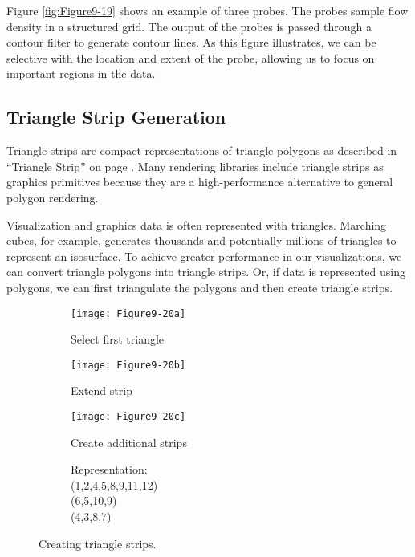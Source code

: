 Figure \ref{fig:Figure9-19} shows an example of three probes. The probes sample flow density in a structured grid. The output of the probes is passed through a contour filter to generate contour lines. As this figure illustrates, we can be selective with the location and extent of the probe, allowing us to focus on important regions in the data.

\subsection{Triangle Strip Generation}

Triangle strips are compact representations of triangle polygons as described in ``Triangle Strip'' on page \pageref{subsec:linear_cells.triangle_strip}. Many rendering libraries include triangle strips as graphics primitives because they are a high-performance alternative to general polygon rendering.

Visualization and graphics data is often represented with triangles. Marching cubes, for example, generates thousands and potentially millions of triangles to represent an isosurface. To achieve greater performance in our visualizations, we can convert triangle polygons into triangle strips. Or, if data is represented using polygons, we can first triangulate the polygons and then create triangle strips.

\begin{figure}[htb]
	\begin{subfigure}[h]{0.48\linewidth}
		\texttt{[image: Figure9-20a]}
		\captionsetup{justification=centering}
		\caption*{Select first triangle}
		\label{fig:Figure9-20a}
	\end{subfigure}
	\hfill
	\begin{subfigure}[h]{0.48\linewidth}
		\texttt{[image: Figure9-20b]}
		\captionsetup{justification=centering}
		\caption*{Extend strip}
		\label{fig:Figure9-20b}
	\end{subfigure}
	\begin{subfigure}[h]{0.48\linewidth}
		\texttt{[image: Figure9-20c]}
		\captionsetup{justification=centering}
		\caption*{Create additional strips}
		\label{fig:Figure9-20c}
	\end{subfigure}
	\hfill
	\begin{subfigure}[h]{0.48\linewidth}
    \centering
        \begin{minipage}[b]{.4\textwidth}
        \centering
        Representation:\\
        (1,2,4,5,8,9,11,12)\\
        (6,5,10,9)\\
        (4,3,8,7)
        \end{minipage}
		\captionsetup{justification=centering}
		\caption*{}
	\end{subfigure}
	\caption{Creating triangle strips.}\label{fig:Figure9-20}
\end{figure}



